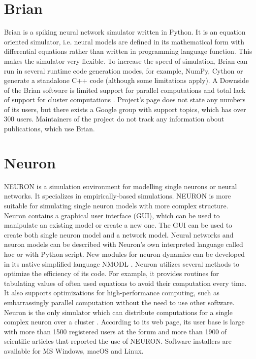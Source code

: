 \section{Brian}

Brian is a spiking neural network simulator written in Python. It is an equation oriented simulator, i.e. neural models are defined in its mathematical form with differential equations rather than written in programming language function. This makes the simulator very flexible. To increase the speed of simulation, Brian can run in several runtime code generation modes, for example, NumPy, Cython or generate a standalone C++ code (although some limitations apply). A Downside of the Brian software is limited support for parallel computations and total lack of support for cluster computations \cite{tikidji-hamburyanSoftwareBrainNetwork2017}. Project's page does not state any numbers of its users, but there exists a Google group \cite{Brian} with support topics, which has over 300 users. Maintainers of the project do not track any information about publications, which use Brian.

\section{Neuron}

NEURON is a simulation environment for modelling single neurons or neural networks. It specializes in empirically-based simulations. NEURON is more suitable for simulating single neuron models with more complex structure. Neuron contains a graphical user interface (GUI), which can be used to manipulate an existing model or create a new one. The GUI can be used to create both single neuron model and a network model.  Neural networks and neuron models can be described with Neuron's own interpreted language called hoc or with Python script. New modules for neuron dynamics can be developed in its native simplified language NMODL \cite{tikidji-hamburyanSoftwareBrainNetwork2017}. Neuron utilizes several methods to optimize the efficiency of its code. For example, it provides routines for tabulating values of often used equations to avoid their computation every time. It also supports optimizations for high-performance computing, such as embarrassingly parallel computation without the need to use other software. Neuron is the only simulator which can distribute computations for a single complex neuron over a cluster \cite{tikidji-hamburyanSoftwareBrainNetwork2017}. According to its web page, its user base is large with more than 1500 registered users at the forum and more than 1900 of scientific articles that reported the use of NEURON. Software installers are available for MS Windows, macOS and Linux.


